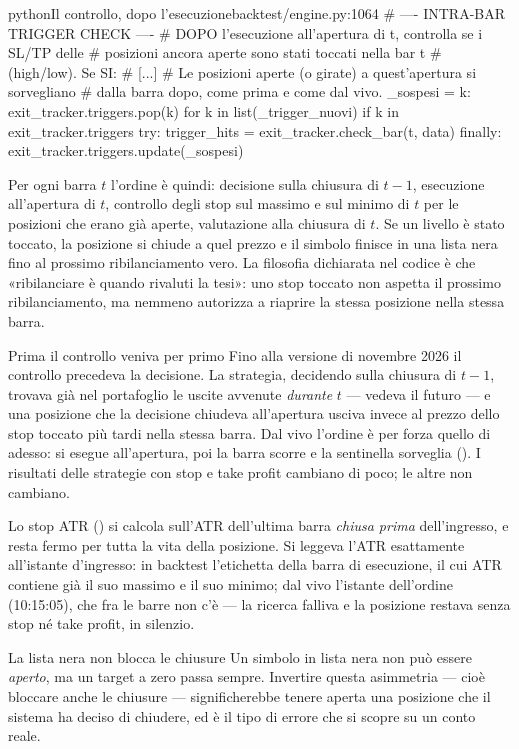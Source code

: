 \begin{codiceInterno}{python}{Il controllo, dopo l'esecuzione}{backtest/engine.py:1064}
            # ---- INTRA-BAR TRIGGER CHECK ----
            # DOPO l'esecuzione all'apertura di t, controlla se i SL/TP delle
            # posizioni ancora aperte sono stati toccati nella bar t
            # (high/low). Se SI:
            # [...]
            # Le posizioni aperte (o girate) a quest'apertura si sorvegliano
            # dalla barra dopo, come prima e come dal vivo.
            _sospesi = {k: exit_tracker.triggers.pop(k)
                        for k in list(_trigger_nuovi) if k in exit_tracker.triggers}
            try:
                trigger_hits = exit_tracker.check_bar(t, data)
            finally:
                exit_tracker.triggers.update(_sospesi)
\end{codiceInterno}

\noindent
Per ogni barra $t$ l'ordine è quindi: decisione sulla chiusura di $t-1$,
esecuzione all'apertura di $t$, controllo degli stop sul massimo e sul minimo
di $t$ per le posizioni che erano già aperte, valutazione alla chiusura di
$t$. Se un livello è stato toccato, la posizione si chiude a quel prezzo e il
simbolo finisce in una lista nera fino al prossimo ribilanciamento vero. La
filosofia dichiarata nel codice è che «ribilanciare è quando rivaluti la
tesi»: uno stop toccato non aspetta il prossimo ribilanciamento, ma nemmeno
autorizza a riaprire la stessa posizione nella stessa barra.

\begin{attenzione}{Prima il controllo veniva per primo}
Fino alla versione di novembre 2026 il controllo precedeva la decisione. La
strategia, decidendo sulla chiusura di $t-1$, trovava già nel portafoglio le
uscite avvenute \emph{durante} $t$ --- vedeva il futuro --- e una posizione
che la decisione chiudeva all'apertura usciva invece al prezzo dello stop
toccato più tardi nella stessa barra. Dal vivo l'ordine è per forza quello di
adesso: si esegue all'apertura, poi la barra scorre e la sentinella sorveglia
(). I risultati delle strategie con stop e take profit
cambiano di poco; le altre non cambiano.
\end{attenzione}

\noindent
Lo stop ATR () si calcola sull'ATR dell'ultima
barra \emph{chiusa prima} dell'ingresso, e resta fermo per tutta la vita della
posizione. Si leggeva l'ATR esattamente all'istante d'ingresso: in backtest
l'etichetta della barra di esecuzione, il cui ATR contiene già il suo massimo
e il suo minimo; dal vivo l'istante dell'ordine (10:15:05), che fra le barre
non c'è --- la ricerca falliva e la posizione restava senza stop né take
profit, in silenzio.

\begin{attenzione}{La lista nera non blocca le chiusure}
Un simbolo in lista nera non può essere \emph{aperto}, ma un target a zero
passa sempre. Invertire questa asimmetria --- cioè bloccare anche le chiusure
--- significherebbe tenere aperta una posizione che il sistema ha deciso di
chiudere, ed è il tipo di errore che si scopre su un conto reale.
\end{attenzione}
